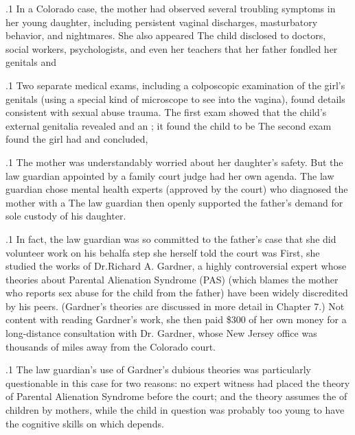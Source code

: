 \documentclass[11pt, twoside]{article}
\begin{document}
{\p.1{%
In a Colorado case, the mother had observed several troubling
symptoms in her young daughter, including persistent vaginal discharges, masturbatory behavior, and nightmares. She also appeared
 The child disclosed to doctors, social workers, psychologists, and even her teachers that her father fondled her genitals and 
}%

\p.1{%
Two separate medical exams, including a colposcopic examination of
the girl’s genitals (using a special kind of microscope to see into the
vagina), found details consistent with sexual abuse trauma. The first
exam showed that the child’s external genitalia revealed  and an ; it found the child to be
 The
second exam found the girl had  and concluded, 
}%

\p.1{%
The mother was understandably worried about her daughter’s safety.
But the law guardian appointed by a family court judge had her own
agenda. The law guardian chose mental health experts (approved by the
court) who diagnosed the mother with a  The law guardian then openly supported the father’s demand for
sole custody of his daughter.
}%

\p.1{%
In fact, the law guardian was so committed to the father’s case that she
did volunteer work on his behalf\mdash{}a step she herself told the court was
 First,  she studied the works of Dr.\@ Richard
A. Gardner, a highly controversial expert whose theories about Parental
Alienation Syndrome (PAS) (which blames the mother who reports sex
abuse for  the child from the father) have been widely discredited by his peers. (Gardner’s theories are discussed in more detail
in Chapter 7.) Not content with reading Gardner’s work, she then paid
\$300 of her own money for a long-distance consultation with Dr. Gardner,
whose New Jersey office was thousands of miles away from the Colorado
court.
}%

\p.1{%
The law guardian’s use of Gardner’s dubious theories was particularly questionable in this case for two reasons: no expert witness had
placed the theory of Parental Alienation Syndrome
before the court; and the theory assumes the
 of children by mothers, while the child in question was
probably too young to have the cognitive skills on which 
depends.
}%

}
\end{document}
